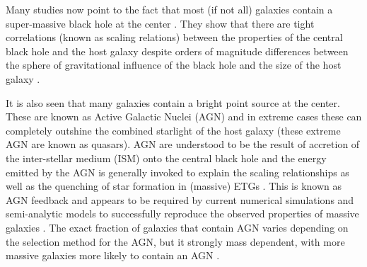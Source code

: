 Many studies now point to the fact that most (if not all) galaxies contain a super-massive black hole at the center \citep{Kormendy2013a}. They show that there are tight correlations (known as scaling relations) between the properties of the central black hole and the host galaxy despite orders of magnitude differences between the sphere of gravitational influence of the black hole and the size of the host galaxy \citep{Gudehus1973, Faber1976, Ferrarese2000, Gebhardt2000}. 

It is also seen that many galaxies contain a bright point source at the center. These are known as Active Galactic Nuclei (AGN) and in extreme cases these can completely outshine the combined starlight of the host galaxy (these extreme AGN are known as quasars). AGN are understood to be the result of accretion of the inter-stellar medium (ISM) onto the central black hole \citep{Lynden-Bell1969} and the energy emitted by the AGN is generally invoked to explain the scaling relationships \citep{Raimundo2010} as well as the quenching of star formation in (massive) ETGs \citep{Croton2006, Somerville2008}. This is known as AGN feedback and appears to be required by current numerical simulations and semi-analytic models to successfully reproduce the observed properties of massive galaxies \citep{Kauffmann2000, Granato2004, DiMatteo2005, Springel2005, Bower2006, Croton2006, Hopkins2006, Ciotti2010, Scannapieco2012}. The exact fraction of galaxies that contain AGN varies depending on the selection method for the AGN, but it strongly mass dependent, with more massive galaxies more likely to contain an AGN \citep{Kauffmann2003a}. 

